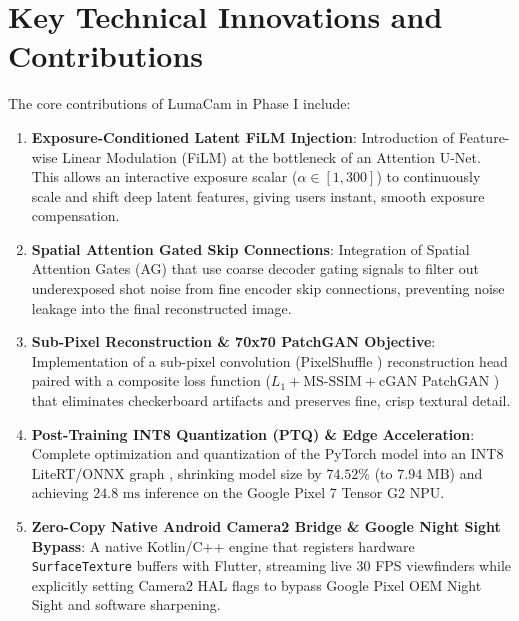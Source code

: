 \section{Key Technical Innovations and Contributions}
The core contributions of LumaCam in Phase I include:
\begin{enumerate}
    \item \textbf{Exposure-Conditioned Latent FiLM Injection}:
    Introduction of Feature-wise Linear Modulation (FiLM) \cite{perez2018film} at the bottleneck of an Attention U-Net. This allows an interactive exposure scalar ($\alpha \in [1, 300]$) to continuously scale and shift deep latent features, giving users instant, smooth exposure compensation.
    \item \textbf{Spatial Attention Gated Skip Connections}:
    Integration of Spatial Attention Gates (AG) \cite{oktay2018attention} that use coarse decoder gating signals to filter out underexposed shot noise from fine encoder skip connections, preventing noise leakage into the final reconstructed image.
    \item \textbf{Sub-Pixel Reconstruction \& 70x70 PatchGAN Objective}:
    Implementation of a sub-pixel convolution (PixelShuffle \cite{shi2016real}) reconstruction head paired with a composite loss function ($L_1 + \text{MS-SSIM} + \text{cGAN}$ PatchGAN \cite{isola2017image, wang2003multiscale}) that eliminates checkerboard artifacts and preserves fine, crisp textural detail.
    \item \textbf{Post-Training INT8 Quantization (PTQ) \& Edge Acceleration}:
    Complete optimization and quantization of the PyTorch model into an INT8 LiteRT/ONNX graph \cite{jacob2018quantization}, shrinking model size by $74.52\%$ (to $7.94\text{ MB}$) and achieving $24.8\text{ ms}$ inference on the Google Pixel 7 Tensor G2 NPU.
    \item \textbf{Zero-Copy Native Android Camera2 Bridge \& Google Night Sight Bypass}:
    A native Kotlin/C++ engine that registers hardware \texttt{SurfaceTexture} buffers with Flutter, streaming live 30 FPS viewfinders while explicitly setting Camera2 HAL flags to bypass Google Pixel OEM Night Sight and software sharpening.
\end{enumerate}

